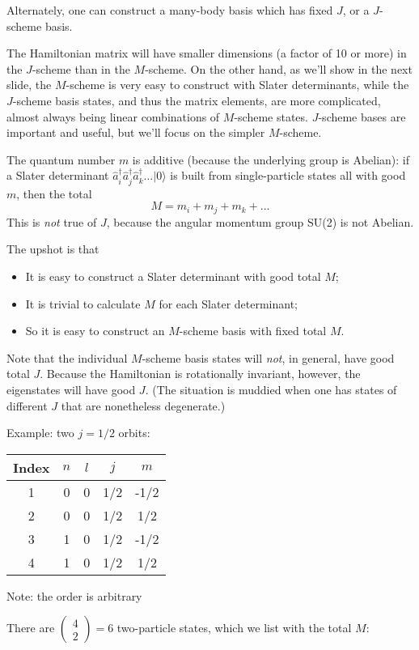 Alternately, one can construct a many-body basis which has fixed $J$, or a $J$-scheme 
basis. 

The Hamiltonian matrix will have smaller dimensions (a factor of 10 or more)
 in the $J$-scheme than in the $M$-scheme. 
On the other hand, as we'll show in the next slide, the $M$-scheme is very easy to 
construct with Slater determinants, while the $J$-scheme basis states, and thus the 
matrix elements, are more complicated, almost always being linear combinations of 
$M$-scheme states. $J$-scheme bases are important and useful, but we'll focus on the 
simpler $M$-scheme.

The quantum number $m$ is additive (because the underlying group is Abelian): 
if a Slater determinant $\hat{a}_i^\dagger \hat{a}^\dagger_j \hat{a}^\dagger_k \ldots 
| 0 \rangle$ is built from single-particle states all with good $m$, then 
the total 
\[
M = m_i + m_j + m_k + \ldots
\]
This is \textit{not} true of $J$, because the angular momentum group SU(2) is not Abelian.

The upshot is that 
\begin{itemize}

\item It is easy to construct a Slater determinant with good total $M$;

\item It is trivial to calculate $M$ for each Slater determinant;

\item So it is easy to construct an $M$-scheme basis with fixed total $M$.

\end{itemize}

Note that the individual $M$-scheme basis states will \textit{not}, in general, 
have good total $J$. 
Because the Hamiltonian is rotationally invariant, however, the eigenstates will 
have good $J$. (The situation is muddied when one has states of different $J$ that are 
nonetheless degenerate.) 

Example: two $j=1/2$ orbits:
\begin{center}

\begin{tabular}{|c|c|c|c|c|} \hline
Index & $n$ & $l$  & $j$ & $m$ \\ \hline 
1 & 0 & 0 & 1/2 & -1/2 \\
2 & 0 & 0 & 1/2 &  1/2 \\
3 & 1 & 0 & 1/2 & -1/2 \\
4 & 1 & 0 & 1/2 & 1/2 \\ \hline
\end{tabular}
%
Note: the order is arbitrary
\end{center}
There are $\left ( \begin{array}{c} 4 \\ 2 \end{array} \right) = 6$ two-particle states, 
which we list with the total $M$:


